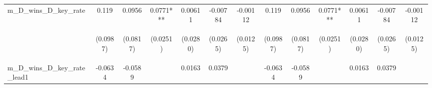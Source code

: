\documentclass[]{article}
\begin{document}
\begin{center}
\begin{tabular}{lcccccccccccc}
m\_D\_wins\_D\_key\_rate & 0.119 & 0.0956 & 0.0771*** & 0.00611 & -0.00784 & -0.00112 & 0.119 & 0.0956 & 0.0771*** & 0.00611 & -0.00784 & -0.00112 \\
\vspace{4pt} & \begin{footnotesize}(0.0987)\end{footnotesize} & \begin{footnotesize}(0.0817)\end{footnotesize} & \begin{footnotesize}(0.0251)\end{footnotesize} & \begin{footnotesize}(0.0280)\end{footnotesize} & \begin{footnotesize}(0.0265)\end{footnotesize} & \begin{footnotesize}(0.0125)\end{footnotesize} & \begin{footnotesize}(0.0987)\end{footnotesize} & \begin{footnotesize}(0.0817)\end{footnotesize} & \begin{footnotesize}(0.0251)\end{footnotesize} & \begin{footnotesize}(0.0280)\end{footnotesize} & \begin{footnotesize}(0.0265)\end{footnotesize} & \begin{footnotesize}(0.0125)\end{footnotesize} \\
m\_D\_wins\_D\_key\_rate\_lead1 & -0.0634 & -0.0589 &  & 0.0163 & 0.0379 &  & -0.0634 & -0.0589 &  & 0.0163 & 0.0379 &  \\

\end{tabular}
\end{center}
\end{document}

